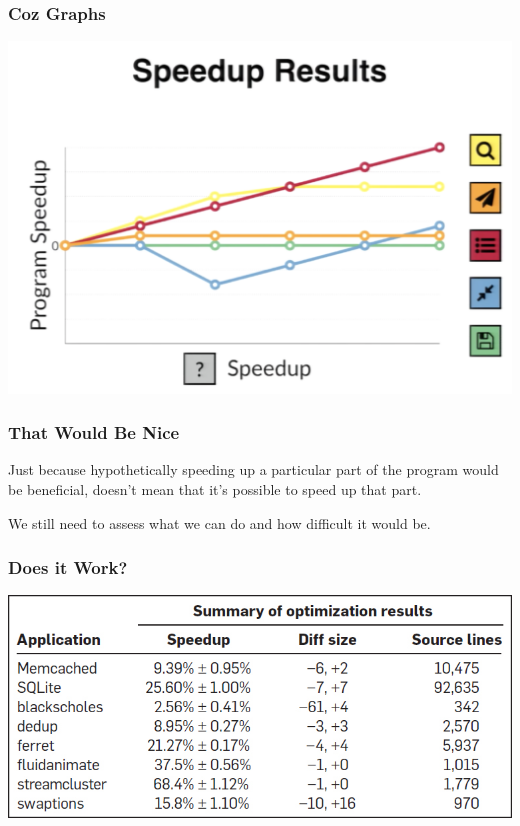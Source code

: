 \begin{frame}
\frametitle{Coz Graphs}

\begin{center}
	\includegraphics[width=\textwidth]{images/coz-speedup-graph.png}
\end{center}

\end{frame}


\begin{frame}
\frametitle{That Would Be Nice}
Just because hypothetically speeding up a particular part of the program would be beneficial, doesn't mean that it's possible to speed up that part.

We still need to assess what we can do and how difficult it would be.

\end{frame}


\begin{frame}
\frametitle{Does it Work?}

\begin{center}
	\includegraphics[width=\textwidth]{images/coz-speedup.jpg}
\end{center}

\end{frame}


